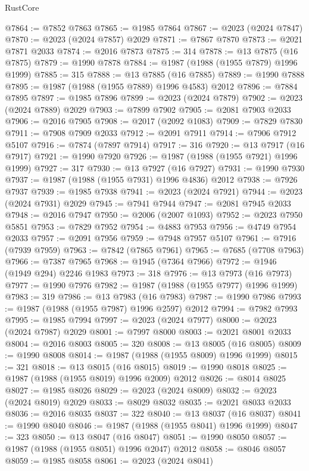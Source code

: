 \begin{lexlean}{RustCore}
\begin{coremodule}
@7864 := @7852 @7863
@7865 := @1985 @7864
@7867 := @2023 (@2024 @7847)
@7870 := @2023 (@2024 @7857) @2029
@7871 := @7867 @7870
@7873 := @2021 @7871 @2033
@7874 := @2016 @7873
@7875 := 314
@7878 := @13 @7875 (@16 @7875)
@7879 := @1990 @7878
@7884 := @1987 (@1988 (@1955 @7879) @1996 @1999)
@7885 := 315
@7888 := @13 @7885 (@16 @7885)
@7889 := @1990 @7888
@7895 := @1987 (@1988 (@1955 @7889) @1996 @4583) @2012
@7896 := @7884 @7895
@7897 := @1985 @7896
@7899 := @2023 (@2024 @7879)
@7902 := @2023 (@2024 @7889) @2029
@7903 := @7899 @7902
@7905 := @2081 @7903 @2033
@7906 := @2016 @7905
@7908 := @2017 (@2092 @1083)
@7909 := @7829 @7830
@7911 := @7908 @7909 @2033
@7912 := @2091 @7911
@7914 := @7906 @7912 @5107
@7916 := @7874 (@7897 @7914)
@7917 := 316
@7920 := @13 @7917 (@16 @7917)
@7921 := @1990 @7920
@7926 := @1987 (@1988 (@1955 @7921) @1996 @1999)
@7927 := 317
@7930 := @13 @7927 (@16 @7927)
@7931 := @1990 @7930
@7937 := @1987 (@1988 (@1955 @7931) @1996 @4836) @2012
@7938 := @7926 @7937
@7939 := @1985 @7938
@7941 := @2023 (@2024 @7921)
@7944 := @2023 (@2024 @7931) @2029
@7945 := @7941 @7944
@7947 := @2081 @7945 @2033
@7948 := @2016 @7947
@7950 := @2006 (@2007 @1093)
@7952 := @2023 @7950 @5851
@7953 := @7829 @7952
@7954 := @4883 @7953
@7956 := @4749 @7954 @2033
@7957 := @2091 @7956
@7959 := @7948 @7957 @5107
@7961 := @7916 (@7939 @7959)
@7963 := @7842 (@7865 @7961)
@7965 := @7685 (@7708 @7963)
@7966 := @7387 @7965
@7968 := @1945 (@7364 @7966)
@7972 := @1946 (@1949 @294) @2246 @1983
@7973 := 318
@7976 := @13 @7973 (@16 @7973)
@7977 := @1990 @7976
@7982 := @1987 (@1988 (@1955 @7977) @1996 @1999)
@7983 := 319
@7986 := @13 @7983 (@16 @7983)
@7987 := @1990 @7986
@7993 := @1987 (@1988 (@1955 @7987) @1996 @2597) @2012
@7994 := @7982 @7993
@7995 := @1985 @7994
@7997 := @2023 (@2024 @7977)
@8000 := @2023 (@2024 @7987) @2029
@8001 := @7997 @8000
@8003 := @2021 @8001 @2033
@8004 := @2016 @8003
@8005 := 320
@8008 := @13 @8005 (@16 @8005)
@8009 := @1990 @8008
@8014 := @1987 (@1988 (@1955 @8009) @1996 @1999)
@8015 := 321
@8018 := @13 @8015 (@16 @8015)
@8019 := @1990 @8018
@8025 := @1987 (@1988 (@1955 @8019) @1996 @2009) @2012
@8026 := @8014 @8025
@8027 := @1985 @8026
@8029 := @2023 (@2024 @8009)
@8032 := @2023 (@2024 @8019) @2029
@8033 := @8029 @8032
@8035 := @2021 @8033 @2033
@8036 := @2016 @8035
@8037 := 322
@8040 := @13 @8037 (@16 @8037)
@8041 := @1990 @8040
@8046 := @1987 (@1988 (@1955 @8041) @1996 @1999)
@8047 := 323
@8050 := @13 @8047 (@16 @8047)
@8051 := @1990 @8050
@8057 := @1987 (@1988 (@1955 @8051) @1996 @2047) @2012
@8058 := @8046 @8057
@8059 := @1985 @8058
@8061 := @2023 (@2024 @8041)

\end{coremodule}
\end{lexlean}

